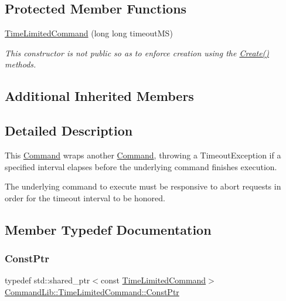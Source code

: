 \subsection*{Protected Member Functions}
\begin{DoxyCompactItemize}
\item 
\mbox{\hyperlink{class_command_lib_1_1_time_limited_command_add0fd2d4443a1c44b99e3291ae4982e3}{Time\+Limited\+Command}} (long long timeout\+MS)
\begin{DoxyCompactList}\small\item\em This constructor is not public so as to enforce creation using the \mbox{\hyperlink{class_command_lib_1_1_time_limited_command_a7b8515c4f2780c7f5d8bc942affbc12b}{Create()}} methods. \end{DoxyCompactList}\end{DoxyCompactItemize}
\subsection*{Additional Inherited Members}


\subsection{Detailed Description}
This \mbox{\hyperlink{class_command_lib_1_1_command}{Command}} wraps another \mbox{\hyperlink{class_command_lib_1_1_command}{Command}}, throwing a Timeout\+Exception if a specified interval elapses before the underlying command finishes execution. 

The underlying command to execute must be responsive to abort requests in order for the timeout interval to be honored. 

\subsection{Member Typedef Documentation}
\mbox{\label{class_command_lib_1_1_time_limited_command_ae2953ea50b6e131e481a2cd309b3a943}} 
\subsubsection{\texorpdfstring{Const\+Ptr}{ConstPtr}}
{\footnotesize\ttfamily typedef std\+::shared\+\_\+ptr$<$const \mbox{\hyperlink{class_command_lib_1_1_time_limited_command}{Time\+Limited\+Command}}$>$ \mbox{\hyperlink{class_command_lib_1_1_time_limited_command_ae2953ea50b6e131e481a2cd309b3a943}{Command\+Lib\+::\+Time\+Limited\+Command\+::\+Const\+Ptr}}}



